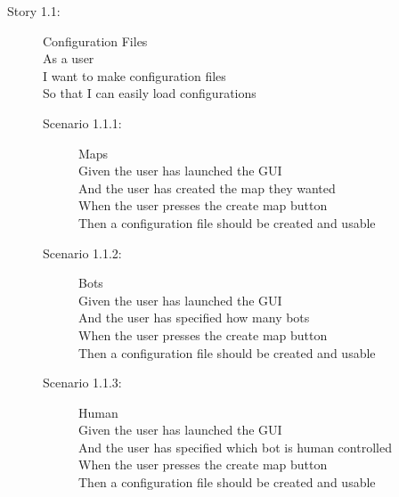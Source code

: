 \begin{description}
	\item[Story 1.1:] Configuration Files\\
	As a user\\
	I want to make configuration files\\
	So that I can easily load configurations

	\begin{description}
		\item[Scenario 1.1.1:] Maps\\
		Given the user has launched the GUI\\
		And the user has created the map they wanted\\
		When the user presses the create map button\\
		Then a configuration file should be created and usable
		
		\item[Scenario 1.1.2:] Bots\\
		Given the user has launched the GUI\\
		And the user has specified how many bots\\
		When the user presses the create map button\\
		Then a configuration file should be created and usable

		\item[Scenario 1.1.3:] Human\\
		Given the user has launched the GUI\\
		And the user has specified which bot is human controlled\\
		When the user presses the create map button\\
		Then a configuration file should be created and usable
	\end{description}
\end{description}

